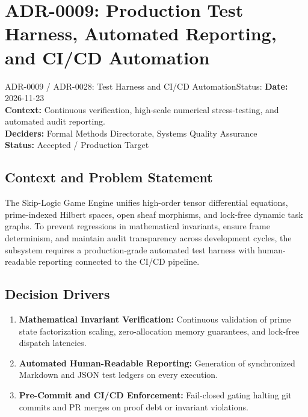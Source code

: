 \section{ADR-0009: Production Test Harness, Automated Reporting, and CI/CD Automation}
\label{sec:adr0009}

\begin{adrbox}{ADR-0009 / ADR-0028: Test Harness and CI/CD Automation}{Status: }
\textbf{Date:} 2026-11-23 \\
\textbf{Context:} Continuous verification, high-scale numerical stress-testing, and automated audit reporting. \\
\textbf{Deciders:} Formal Methods Directorate, Systems Quality Assurance \\
\textbf{Status:} Accepted / Production Target
\end{adrbox}

\subsection{Context and Problem Statement}
The Skip-Logic Game Engine unifies high-order tensor differential equations, prime-indexed Hilbert spaces, open sheaf morphisms, and lock-free dynamic task graphs. To prevent regressions in mathematical invariants, ensure frame determinism, and maintain audit transparency across development cycles, the subsystem requires a production-grade automated test harness with human-readable reporting connected to the CI/CD pipeline.

\subsection{Decision Drivers}
\begin{enumerate}[label=\bfseries D\arabic*.]
    \item \textbf{Mathematical Invariant Verification:} Continuous validation of prime state factorization scaling, zero-allocation memory guarantees, and lock-free dispatch latencies.
    \item \textbf{Automated Human-Readable Reporting:} Generation of synchronized Markdown and JSON test ledgers on every execution.
    \item \textbf{Pre-Commit and CI/CD Enforcement:} Fail-closed gating halting git commits and PR merges on proof debt or invariant violations.
\end{enumerate}

